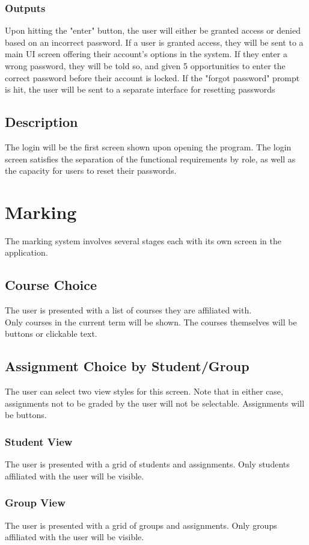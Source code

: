 \documentclass{article}
\begin{document}
\subsubsection{Outputs}
Upon hitting the "enter" button, the user will either be granted access or denied based
on an incorrect password. If a user is granted access, they will be sent
to a main UI screen offering their account's options in the system. If they enter a wrong
password, they will be told so, and given 5 opportunities to enter the correct password
before their account is locked. If the "forgot password" prompt is hit, the user will be sent
to a separate interface for resetting passwords
\subsection{Description}
The login will be the first screen shown upon opening the program. The login screen 
satisfies the separation of the functional requirements by role, as well as the capacity for users
to reset their passwords.

\section{Marking}
The marking system involves several stages each with its own screen in
the application.
\subsection{Course Choice}
The user is presented with a list of courses they are affiliated with. \\
Only courses in the current term will be shown. The courses themselves
will be buttons or clickable text.
\subsection{Assignment Choice by Student/Group}
The user can select two view styles for this screen. Note that in either case,
assignments not to be graded by the user will not be selectable. Assignments
will be buttons.
\subsubsection{Student View}
The user is presented with a grid of students and assignments. Only students
affiliated with the user will be visible.
\subsubsection{Group View}
The user is presented with a grid of groups and assignments. Only groups
affiliated with the user will be visible.
\end{document}
